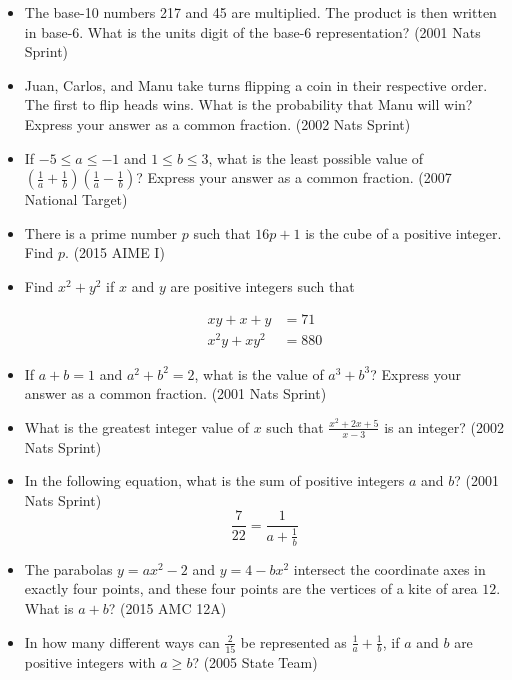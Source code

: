 \documentclass{article}
\begin{document}
\begin{itemize}
\begin{itemize}
\item The base-10 numbers 217 and 45 are multiplied. The product is then written in base-6. What is the units digit of the base-6 representation? (2001 Nats Sprint)

\item Juan, Carlos, and Manu take turns flipping a coin in their respective order. The first to flip heads wins. What is the probability that Manu will win? Express your answer as a common fraction. (2002 Nats Sprint)

\item If $-5\le a\le -1$ and $1\le b\le 3$, what is the least possible value of $\left( \frac{1}{a}+\frac{1}{b}\right) \left(\frac{1}{a}-\frac{1}{b}\right)$? Express your answer as a common fraction. (2007 National Target)

\item There is a prime number $p$ such that $16p+1$ is the cube of a positive integer. Find $p$. (2015 AIME I)

\item Find $x^2+y^2$ if $x$ and $y$ are positive integers such that 

\begin{align*}
xy+x+y &=71 \\
x^2y+xy^2 &= 880
\end{align*}

\item If $a+b=1$ and $a^2+b^2=2$, what is the value of $a^3+b^3$? Express your answer as a common fraction. (2001 Nats Sprint)

\item What is the greatest integer value of $x$ such that $\frac{x^2+2x+5}{x-3}$ is an integer? (2002 Nats Sprint)

\item In the following equation, what is the sum of positive integers $a$ and $b$? (2001 Nats Sprint)
$$\frac{7}{22}=\frac{1}{a+\frac{1}{b}}$$

\item The parabolas $y=ax^2-2$ and $y=4-bx^2$ intersect the coordinate axes in exactly four points, and these four points are the vertices of a kite of area $12$. What is $a+b$? (2015 AMC 12A)

\item In how many different ways can $\frac{2}{15}$ be represented as $\frac{1}{a}+\frac{1}{b}$, if $a$ and $b$ are positive integers with $a\ge b$? (2005 State Team)


\end{itemize}
\end{itemize}
\end{document}
